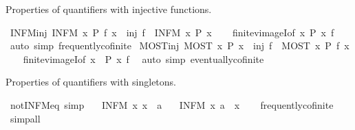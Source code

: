 \begin{isabellebody}
\begin{isamarkuptext}
Properties of quantifiers with injective functions.%
\end{isamarkuptext}\isamarkuptrue%
\isamarkupfalse%
\ INFM{\isacharunderscore}inj{\isacharcolon}\ {\isachardoublequoteopen}INFM\ x{\isachardot}\ P\ {\isacharparenleft}f\ x{\isacharparenright}\ {\isasymLongrightarrow}\ inj\ f\ {\isasymLongrightarrow}\ INFM\ x{\isachardot}\ P\ x{\isachardoublequoteclose}\isanewline
%
\isadelimproof
\ \ %
\endisadelimproof
%
\isatagproof
{}\isamarkupfalse%
\ finite{\isacharunderscore}vimageI{\isacharbrackleft}of\ {\isachardoublequoteopen}{\isacharbraceleft}x{\isachardot}\ P\ x{\isacharbraceright}{\isachardoublequoteclose}\ f{\isacharbrackright}\ \isamarkupfalse%
\ {\isacharparenleft}auto\ simp{\isacharcolon}\ frequently{\isacharunderscore}cofinite{\isacharparenright}%
\endisatagproof
{\isafoldproof}%
%
\isadelimproof
\isanewline
%
\endisadelimproof
\isanewline
{}\isamarkupfalse%
\ MOST{\isacharunderscore}inj{\isacharcolon}\ {\isachardoublequoteopen}MOST\ x{\isachardot}\ P\ x\ {\isasymLongrightarrow}\ inj\ f\ {\isasymLongrightarrow}\ MOST\ x{\isachardot}\ P\ {\isacharparenleft}f\ x{\isacharparenright}{\isachardoublequoteclose}\isanewline
%
\isadelimproof
\ \ %
\endisadelimproof
%
\isatagproof
{}\isamarkupfalse%
\ finite{\isacharunderscore}vimageI{\isacharbrackleft}of\ {\isachardoublequoteopen}{\isacharbraceleft}x{\isachardot}\ {\isasymnot}\ P\ x{\isacharbraceright}{\isachardoublequoteclose}\ f{\isacharbrackright}\ \isamarkupfalse%
\ {\isacharparenleft}auto\ simp{\isacharcolon}\ eventually{\isacharunderscore}cofinite{\isacharparenright}%
\endisatagproof
{\isafoldproof}%
%
\isadelimproof
%
\endisadelimproof
%
\begin{isamarkuptext}%
Properties of quantifiers with singletons.%
\end{isamarkuptext}\isamarkuptrue%
\isamarkupfalse%
\ not{\isacharunderscore}INFM{\isacharunderscore}eq\ {\isacharbrackleft}simp{\isacharbrackright}{\isacharcolon}\isanewline
\ \ {\isachardoublequoteopen}{\isasymnot}\ {\isacharparenleft}INFM\ x{\isachardot}\ x\ {\isacharequal}\ a{\isacharparenright}{\isachardoublequoteclose}\isanewline
\ \ {\isachardoublequoteopen}{\isasymnot}\ {\isacharparenleft}INFM\ x{\isachardot}\ a\ {\isacharequal}\ x{\isacharparenright}{\isachardoublequoteclose}\isanewline
%
\isadelimproof
\ \ %
\endisadelimproof
%
\isatagproof
{}\isamarkupfalse%
\ frequently{\isacharunderscore}cofinite\ \isamarkupfalse%
\ simp{\isacharunderscore}all%

\end{isabellebody}
